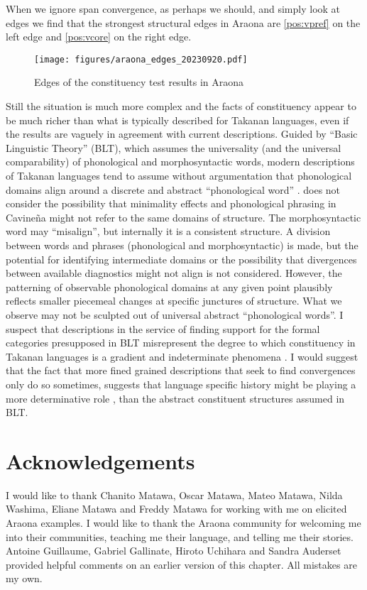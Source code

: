 \documentclass[output=paper,hidelinks]{langscibook}
\begin{document}
When we ignore span convergence, as perhaps we should, and simply look at edges we find that the strongest structural edges in Araona are \ref{pos:vpref} on the left edge and \ref{pos:vcore} on the right edge.

\begin{figure}
    \texttt{[image: figures/araona\_edges\_20230920.pdf]}
    \caption{Edges of the constituency test results in Araona}
    \label{fig:edges}
\end{figure}


Still the situation is much more complex and the facts of constituency appear to be much richer than what is typically described for Takanan languages, even if the results are vaguely in agreement with current descriptions. Guided by ``Basic Linguistic Theory'' (BLT), which assumes the universality (and the universal comparability) of phonological and morphosyntactic words, modern descriptions of Takanan languages tend to assume without argumentation that phonological domains align around a discrete and abstract ``phonological word'' \citep{Guillaume2008, vuillermet:phd2012, emkow:2019:araonarepublish}.  \citet{Guillaume2008} does not consider the possibility that minimality effects and phonological phrasing in Cavineña might not refer to the same domains of structure. The morphosyntactic word may ``misalign'', but internally it is a consistent structure. A division between words and phrases (phonological and morphosyntactic) is made, but the potential for identifying intermediate domains or the possibility that divergences between available diagnostics might not align is not considered.
However, the patterning of observable phonological domains at any given point plausibly reflects smaller piecemeal changes at specific junctures of structure. What we observe may not be sculpted out of universal abstract ``phonological words''. I suspect that descriptions in the service of finding support for the formal categories presupposed in BLT misrepresent the degree to which constituency in Takanan languages is a gradient and indeterminate phenomena \citep{Bybee2001a, Bybee2010}. I would suggest that the fact that more fined grained descriptions that seek to find convergences only do so sometimes, suggests that language specific history might be playing a more determinative role \citep{Blevins2004}, than the abstract constituent structures assumed in BLT.


\section*{Acknowledgements}
I would like to thank Chanito Matawa, Oscar Matawa, Mateo Matawa, Nilda Washima, Eliane Matawa and Freddy Matawa for working with me on elicited Araona examples. I would like to thank the Araona community for welcoming me into their communities, teaching me their language, and telling me their stories. Antoine Guillaume, Gabriel Gallinate, Hiroto Uchihara and Sandra Auderset provided helpful comments on an earlier version of this chapter. All mistakes are my own.

\printglossary

\printbibliography[heading=subbibliography,notkeyword=this]
\end{document}
